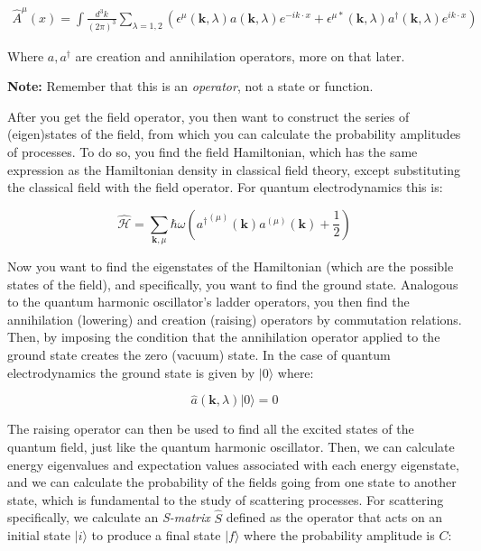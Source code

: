 \begin{align*}
\hat A^\mu(x) = \int \frac{d^3k}{(2\pi)^3} \sum_{\lambda=1,2} \left( \epsilon^\mu(\mathbf{k}, \lambda) a(\mathbf{k}, \lambda) e^{-ik \cdot x} + \epsilon^{\mu *}(\mathbf{k}, \lambda) a^\dagger(\mathbf{k}, \lambda) e^{ik \cdot x} \right)
\end{align*}

Where $a, a^\dagger$ are creation and annihilation operators, more on that later. 

\begin{framed}
\textbf{Note:} Remember that this is an \emph{operator}, not a state or
function.
\end{framed}

After you get the field operator, you then want to construct the series of (eigen)states of the field, from which you can calculate the probability amplitudes of processes. To do so, you find the field Hamiltonian, which has the same expression as the Hamiltonian density in classical field theory, except substituting the classical field with the field operator. For quantum electrodynamics this is:

\begin{equation}
\hat{\mathcal{H}}=\sum _{\mathbf {k} ,\mu }\hbar \omega \left({a^{\dagger }}^{(\mu )}(\mathbf {k} )a^{(\mu )}(\mathbf {k} )+{\frac {1}{2}}\right)
\end{equation}

Now you want to find the eigenstates of the Hamiltonian (which are the possible states of the field), and specifically, you want to find the ground state. Analogous to the quantum harmonic oscillator's ladder operators, you then find the annihilation (lowering) and creation (raising) operators by commutation relations. Then, by imposing the condition that the annihilation operator applied to the ground state creates the zero (vacuum) state. In the case of quantum electrodynamics the ground state is given by $|0 \rangle$ where:

\begin{equation}
\hat a (\mathbf{k}, \lambda)| 0 \rangle = 0
\end{equation}

The raising operator can then be used to find all the excited states of the quantum field, just like the quantum harmonic oscillator. Then, we can calculate energy eigenvalues and expectation values associated with each energy eigenstate, and we can calculate the probability of the fields going from one state to another state, which is fundamental to the study of scattering processes. For scattering specifically, we calculate an \emph{S-matrix} $\hat S$ defined as the operator that acts on an initial state $|i \rangle$ to produce a final state $|f\rangle$ where the probability amplitude is $C$:

